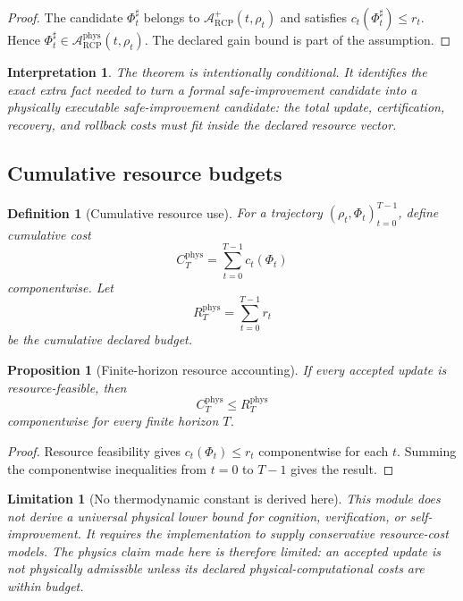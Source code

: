 \documentclass[11pt]{article}
\newtheorem{proposition}[theorem]{Proposition}
\newtheorem{definition}[theorem]{Definition}
\newtheorem{interpretation}[theorem]{Interpretation}
\newtheorem{limitation}[theorem]{Limitation}
\newcommand{\Acal}{\mathcal{A}}
\newcommand{\1}{\mathbf{1}}
\newcommand{\RCP}{\mathrm{RCP}}
\providecommand{\phys}{\mathrm{phys}}
\begin{document}
\begin{proof}
The candidate \(\Phi_t^\sharp\) belongs to \(\Acal_{\RCP}^{+}(t,\rho_t)\) and satisfies \(c_t(\Phi_t^\sharp)\le r_t\).  Hence \(\Phi_t^\sharp\in\Acal_{\RCP}^{\phys}(t,\rho_t)\).  The declared gain bound is part of the assumption.
\end{proof}

\begin{interpretation}
The theorem is intentionally conditional.  It identifies the exact extra fact needed to turn a formal safe-improvement candidate into a physically executable safe-improvement candidate: the total update, certification, recovery, and rollback costs must fit inside the declared resource vector.
\end{interpretation}

\subsection{Cumulative resource budgets}

\begin{definition}[Cumulative resource use]
\label{def:cumulative_resource_use}
For a trajectory \((\rho_t,\Phi_t)_{t=0}^{T-1}\), define cumulative cost
\[
C_T^{\phys}
=
\sum_{t=0}^{T-1}c_t(\Phi_t)
\]
componentwise.  Let
\[
R_T^{\phys}
=
\sum_{t=0}^{T-1}r_t
\]
be the cumulative declared budget.
\end{definition}

\begin{proposition}[Finite-horizon resource accounting]
\label{prop:finite_horizon_resource_accounting}
If every accepted update is resource-feasible, then
\[
C_T^{\phys}
\le
R_T^{\phys}
\]
componentwise for every finite horizon \(T\).
\end{proposition}

\begin{proof}
Resource feasibility gives \(c_t(\Phi_t)\le r_t\) componentwise for each \(t\).  Summing the componentwise inequalities from \(t=0\) to \(T-1\) gives the result.
\end{proof}

\begin{limitation}[No thermodynamic constant is derived here]
This module does not derive a universal physical lower bound for cognition, verification, or self-improvement.  It requires the implementation to supply conservative resource-cost models.  The physics claim made here is therefore limited: an accepted update is not physically admissible unless its declared physical-computational costs are within budget.
\end{limitation}
\end{document}
